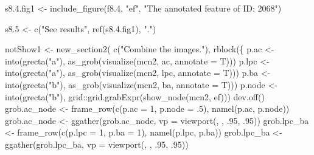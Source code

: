 \documentclass[
]{article}
\newenvironment{Shaded}{\begin{snugshade}}{\end{snugshade}}
\newcommand{\AttributeTok}[1]{\textcolor[rgb]{0.77,0.63,0.00}{#1}}
\newcommand{\DecValTok}[1]{\textcolor[rgb]{0.00,0.00,0.81}{#1}}
\newcommand{\FloatTok}[1]{\textcolor[rgb]{0.00,0.00,0.81}{#1}}
\newcommand{\FunctionTok}[1]{\textcolor[rgb]{0.00,0.00,0.00}{#1}}
\newcommand{\NormalTok}[1]{#1}
\newcommand{\OtherTok}[1]{\textcolor[rgb]{0.56,0.35,0.01}{#1}}
\newcommand{\SpecialCharTok}[1]{\textcolor[rgb]{0.00,0.00,0.00}{#1}}
\newcommand{\StringTok}[1]{\textcolor[rgb]{0.31,0.60,0.02}{#1}}
\begin{document}
\begin{Shaded}
\begin{Highlighting}[]
\NormalTok{s8.}\FloatTok{4.}\NormalTok{fig1 }\OtherTok{\textless{}{-}} \FunctionTok{include\_figure}\NormalTok{(f8}\FloatTok{.4}\NormalTok{, }\StringTok{"ef"}\NormalTok{, }\StringTok{"The annotated feature of ID: 2068"}\NormalTok{)}

\NormalTok{s8}\FloatTok{.5} \OtherTok{\textless{}{-}} \FunctionTok{c}\NormalTok{(}\StringTok{"See results"}\NormalTok{, }\FunctionTok{ref}\NormalTok{(s8.}\FloatTok{4.}\NormalTok{fig1), }\StringTok{"."}\NormalTok{)}

\NormalTok{notShow1 }\OtherTok{\textless{}{-}} \FunctionTok{new\_section2}\NormalTok{(}
  \FunctionTok{c}\NormalTok{(}\StringTok{"Combine the images."}\NormalTok{),}
  \FunctionTok{rblock}\NormalTok{(\{}
\NormalTok{    p.ac }\OtherTok{\textless{}{-}} \FunctionTok{into}\NormalTok{(}\FunctionTok{grecta}\NormalTok{(}\StringTok{"a"}\NormalTok{), }\FunctionTok{as\_grob}\NormalTok{(}\FunctionTok{visualize}\NormalTok{(mcn2, ac, }\AttributeTok{annotate =}\NormalTok{ T)))}
\NormalTok{    p.lpc }\OtherTok{\textless{}{-}} \FunctionTok{into}\NormalTok{(}\FunctionTok{grecta}\NormalTok{(}\StringTok{"a"}\NormalTok{), }\FunctionTok{as\_grob}\NormalTok{(}\FunctionTok{visualize}\NormalTok{(mcn2, lpc, }\AttributeTok{annotate =}\NormalTok{ T)))}
\NormalTok{    p.ba }\OtherTok{\textless{}{-}} \FunctionTok{into}\NormalTok{(}\FunctionTok{grecta}\NormalTok{(}\StringTok{"b"}\NormalTok{), }\FunctionTok{as\_grob}\NormalTok{(}\FunctionTok{visualize}\NormalTok{(mcn2, ba, }\AttributeTok{annotate =}\NormalTok{ T)))}
\NormalTok{    p.node }\OtherTok{\textless{}{-}} \FunctionTok{into}\NormalTok{(}\FunctionTok{grecta}\NormalTok{(}\StringTok{"b"}\NormalTok{), grid}\SpecialCharTok{::}\FunctionTok{grid.grabExpr}\NormalTok{(}\FunctionTok{show\_node}\NormalTok{(mcn2, ef)))}
    \FunctionTok{dev.off}\NormalTok{()}
\NormalTok{    grob.ac\_node }\OtherTok{\textless{}{-}} \FunctionTok{frame\_row}\NormalTok{(}\FunctionTok{c}\NormalTok{(}\AttributeTok{p.ac =} \DecValTok{1}\NormalTok{, }\AttributeTok{p.node =}\NormalTok{ .}\DecValTok{5}\NormalTok{), }\FunctionTok{namel}\NormalTok{(p.ac, p.node))}
\NormalTok{    grob.ac\_node }\OtherTok{\textless{}{-}} \FunctionTok{ggather}\NormalTok{(grob.ac\_node, }\AttributeTok{vp =} \FunctionTok{viewport}\NormalTok{(, , .}\DecValTok{95}\NormalTok{, .}\DecValTok{95}\NormalTok{))}
\NormalTok{    grob.lpc\_ba }\OtherTok{\textless{}{-}} \FunctionTok{frame\_row}\NormalTok{(}\FunctionTok{c}\NormalTok{(}\AttributeTok{p.lpc =} \DecValTok{1}\NormalTok{, }\AttributeTok{p.ba =} \DecValTok{1}\NormalTok{), }\FunctionTok{namel}\NormalTok{(p.lpc, p.ba))}
\NormalTok{    grob.lpc\_ba }\OtherTok{\textless{}{-}} \FunctionTok{ggather}\NormalTok{(grob.lpc\_ba, }\AttributeTok{vp =} \FunctionTok{viewport}\NormalTok{(, , .}\DecValTok{95}\NormalTok{, .}\DecValTok{95}\NormalTok{))}

\end{Highlighting}
\end{Shaded}
\end{document}
